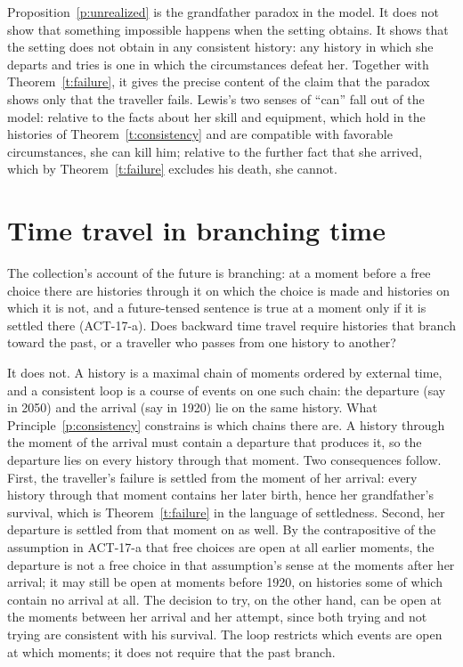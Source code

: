 \documentclass{situationist-preprint}
\begin{document}
Proposition~\ref{p:unrealized} is the grandfather paradox in the model. It does not show that something impossible happens when the setting obtains. It shows that the setting does not obtain in any consistent history: any history in which she departs and tries is one in which the circumstances defeat her. Together with Theorem~\ref{t:failure}, it gives the precise content of the claim that the paradox shows only that the traveller fails. Lewis's two senses of \enquote{can} fall out of the model: relative to the facts about her skill and equipment, which hold in the histories of Theorem~\ref{t:consistency} and are compatible with favorable circumstances, she can kill him; relative to the further fact that she arrived, which by Theorem~\ref{t:failure} excludes his death, she cannot.

\section{Time travel in branching time}\label{s:branch}

The collection's account of the future is branching: at a moment before a free choice there are histories through it on which the choice is made and histories on which it is not, and a future-tensed sentence is true at a moment only if it is settled there (ACT-17-a). Does backward time travel require histories that branch toward the past, or a traveller who passes from one history to another?

It does not. A history is a maximal chain of moments ordered by external time, and a consistent loop is a course of events on one such chain: the departure (say in 2050) and the arrival (say in 1920) lie on the same history. What Principle~\ref{p:consistency} constrains is which chains there are. A history through the moment of the arrival must contain a departure that produces it, so the departure lies on every history through that moment. Two consequences follow. First, the traveller's failure is settled from the moment of her arrival: every history through that moment contains her later birth, hence her grandfather's survival, which is Theorem~\ref{t:failure} in the language of settledness. Second, her departure is settled from that moment on as well. By the contrapositive of the assumption in ACT-17-a that free choices are open at all earlier moments, the departure is not a free choice in that assumption's sense at the moments after her arrival; it may still be open at moments before 1920, on histories some of which contain no arrival at all. The decision to try, on the other hand, can be open at the moments between her arrival and her attempt, since both trying and not trying are consistent with his survival. The loop restricts which events are open at which moments; it does not require that the past branch.
\end{document}
